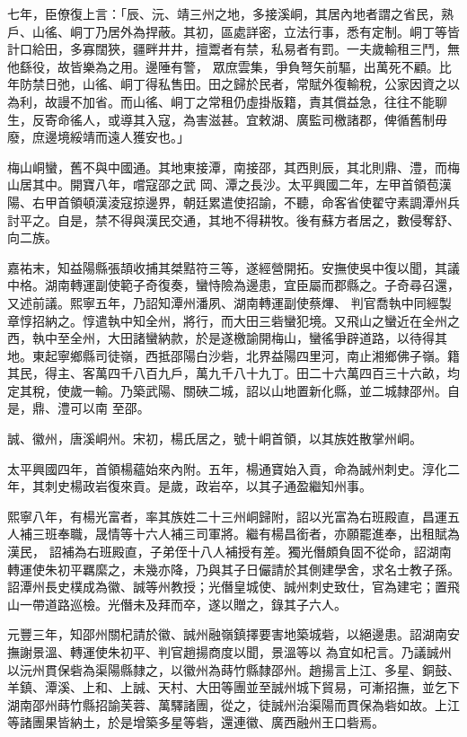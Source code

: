 \begin{pinyinscope}
 七年，臣僚復上言：「辰、沅、靖三州之地，多接溪峒，其居內地者謂之省民，熟戶、山徭、峒丁乃居外為捍蔽。其初，區處詳密，立法行事，悉有定制。峒丁等皆計口給田，多寡闊狹，疆畔井井，擅鬻者有禁，私易者有罰。一夫歲輸租三鬥，無他繇役，故皆樂為之用。邊陲有警，
 眾庶雲集，爭負弩矢前驅，出萬死不顧。比年防禁日弛，山徭、峒丁得私售田。田之歸於民者，常賦外復輸稅，公家因資之以為利，故謾不加省。而山徭、峒丁之常租仍虛掛版籍，責其償益急，往往不能聊生，反寄命徭人，或導其入寇，為害滋甚。宜敕湖、廣監司檄諸郡，俾循舊制毋廢，庶邊境綏靖而遠人獲安也。」



 梅山峒蠻，舊不與中國通。其地東接潭，南接邵，其西則辰，其北則鼎、澧，而梅山居其中。開寶八年，嚐寇邵之武
 岡、潭之長沙。太平興國二年，左甲首領苞漢陽、右甲首領頓漢淩寇掠邊界，朝廷累遣使招諭，不聽，命客省使翟守素調潭州兵討平之。自是，禁不得與漢民交通，其地不得耕牧。後有蘇方者居之，數侵奪舒、向二族。



 嘉祐末，知益陽縣張頡收捕其桀黠符三等，遂經營開拓。安撫使吳中復以聞，其議中格。湖南轉運副使範子奇復奏，蠻恃險為邊患，宜臣屬而郡縣之。子奇尋召還，又述前議。熙寧五年，乃詔知潭州潘夙、湖南轉運副使蔡熚、
 判官喬執中同經製章惇招納之。惇遣執中知全州，將行，而大田三砦蠻犯境。又飛山之蠻近在全州之西，執中至全州，大田諸蠻納款，於是遂檄諭開梅山，蠻徭爭辟道路，以待得其地。東起寧鄉縣司徒嶺，西抵邵陽白沙砦，北界益陽四里河，南止湘鄉佛子嶺。籍其民，得主、客萬四千八百九戶，萬九千八十九丁。田二十六萬四百三十六畝，均定其稅，使歲一輸。乃築武陽、關硤二城，詔以山地置新化縣，並二城隸邵州。自是，鼎、澧可以南
 至邵。



 誠、徽州，唐溪峒州。宋初，楊氏居之，號十峒首領，以其族姓散掌州峒。



 太平興國四年，首領楊蘊始來內附。五年，楊通寶始入貢，命為誠州刺史。淳化二年，其刺史楊政岩復來貢。是歲，政岩卒，以其子通盈繼知州事。



 熙寧八年，有楊光富者，率其族姓二十三州峒歸附，詔以光富為右班殿直，昌運五人補三班奉職，晟情等十六人補三司軍將。繼有楊昌銜者，亦願罷進奉，出租賦為漢民，
 詔補為右班殿直，子弟侄十八人補授有差。獨光僭頗負固不從命，詔湖南轉運使朱初平羈縻之，未幾亦降，乃與其子日儼請於其側建學舍，求名士教子孫。詔潭州長史樸成為徽、誠等州教授；光僭皇城使、誠州刺史致仕，官為建宅；置飛山一帶道路巡檢。光僭未及拜而卒，遂以贈之，錄其子六人。



 元豐三年，知邵州關杞請於徽、誠州融嶺鎮擇要害地築城砦，以絕邊患。詔湖南安撫謝景溫、轉運使朱初平、判官趙揚商度以聞，景溫等以
 為宜如杞言。乃議誠州以沅州貫保砦為渠陽縣隸之，以徽州為蒔竹縣隸邵州。趙揚言上江、多星、銅鼓、羊鎮、潭溪、上和、上誠、天村、大田等團並至誠州城下貿易，可漸招撫，並乞下湖南邵州蒔竹縣招諭芙蓉、萬驛諸團，從之，徒誠州治渠陽而貫保為砦如故。上江等諸團果皆納土，於是增築多星等砦，還連徽、廣西融州王口砦焉。




\end{pinyinscope}

